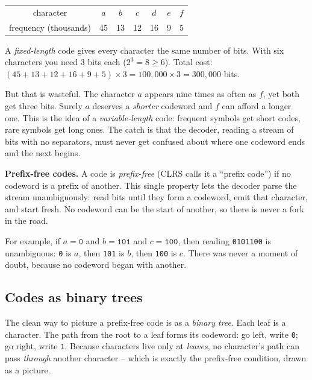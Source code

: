 \begin{center}
\begin{tabular}{c|cccccc}
\toprule
character & $a$ & $b$ & $c$ & $d$ & $e$ & $f$ \\
frequency (thousands) & 45 & 13 & 12 & 16 & 9 & 5 \\
\bottomrule
\end{tabular}
\end{center}

A \emph{fixed-length} code gives every character the same number of bits. With
six characters you need $3$ bits each ($2^3 = 8 \ge 6$). Total cost: $(45 + 13 +
12 + 16 + 9 + 5) \times 3 = 100{,}000 \times 3 = 300{,}000$ bits.

But that is wasteful. The character $a$ appears nine times as often as $f$, yet
both get three bits. Surely $a$ deserves a \emph{shorter} codeword and $f$ can
afford a longer one. This is the idea of a \emph{variable-length} code: frequent
symbols get short codes, rare symbols get long ones. The catch is that the
decoder, reading a stream of bits with no separators, must never get confused
about where one codeword ends and the next begins.

\begin{focusbox}
\textbf{Prefix-free codes.} A code is \emph{prefix-free} (CLRS calls it a
``prefix code'') if no codeword is a prefix of another. This single property lets
the decoder parse the stream unambiguously: read bits until they form a
codeword, emit that character, and start fresh. No codeword can be the start of
another, so there is never a fork in the road.
\end{focusbox}

For example, if $a = \texttt{0}$ and $b = \texttt{101}$ and $c = \texttt{100}$,
then reading \texttt{0101100} is unambiguous: \texttt{0} is $a$, then
\texttt{101} is $b$, then \texttt{100} is $c$. There was never a moment of doubt,
because no codeword began with another.

\subsection{Codes as binary trees}

The clean way to picture a prefix-free code is as a \emph{binary tree}. Each leaf
is a character. The path from the root to a leaf forms its codeword: go left,
write \texttt{0}; go right, write \texttt{1}. Because characters live only at
\emph{leaves}, no character's path can pass \emph{through} another character --
which is exactly the prefix-free condition, drawn as a picture.

